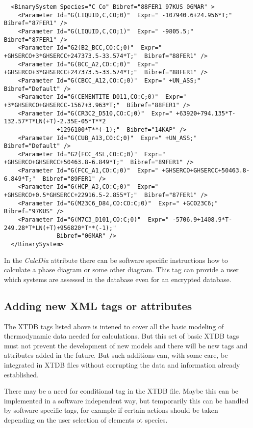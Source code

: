 \documentclass{article}
\begin{document}
{\begin{verbatim}
  <BinarySystem Species="C Co" Bibref="88FER1 97KUS 06MAR" >
    <Parameter Id="G(LIQUID,C,CO;0)"  Expr=" -107940.6+24.956*T;"  Bibref="87FER1" />
    <Parameter Id="G(LIQUID,C,CO;1)"  Expr=" -9805.5;"  Bibref="87FER1" />
    <Parameter Id="G2(B2_BCC,CO:C;0)"  Expr=" +GHSERCO+3*GHSERCC+247373.5-33.574*T;"  Bibref="88FER1" />
    <Parameter Id="G(BCC_A2,CO:C;0)"  Expr=" +GHSERCO+3*GHSERCC+247373.5-33.574*T;"  Bibref="88FER1" />
    <Parameter Id="G(CBCC_A12,CO:C;0)"  Expr=" +UN_ASS;"  Bibref="Default" />
    <Parameter Id="G(CEMENTITE_D011,CO:C;0)"  Expr=" +3*GHSERCO+GHSERCC-1567+3.963*T;"  Bibref="88FER1" />
    <Parameter Id="G(CR3C2_D510,CO:C;0)"  Expr=" +63920+794.135*T-132.57*T*LN(+T)-2.35E-05*T**2
               +1296100*T**(-1);"  Bibref="14KAP" />
    <Parameter Id="G(CUB_A13,CO:C;0)"  Expr=" +UN_ASS;"  Bibref="Default" />
    <Parameter Id="G2(FCC_4SL,CO:C;0)"  Expr=" +GHSERCO+GHSERCC+50463.8-6.849*T;"  Bibref="89FER1" />
    <Parameter Id="G(FCC_A1,CO:C;0)"  Expr=" +GHSERCO+GHSERCC+50463.8-6.849*T;"  Bibref="89FER1" />
    <Parameter Id="G(HCP_A3,CO:C;0)"  Expr=" +GHSERCO+0.5*GHSERCC+22916.5-2.855*T;"  Bibref="87FER1" />
    <Parameter Id="G(M23C6_D84,CO:CO:C;0)"  Expr=" +GCO23C6;"  Bibref="97KUS" />
    <Parameter Id="G(M7C3_D101,CO:C;0)"  Expr=" -5706.9+1408.9*T-249.28*T*LN(+T)+956820*T**(-1);"
               Bibref="06MAR" />
  </BinarySystem>
\end{verbatim}
}

In the {\em CalcDia} attribute there can be  software specific
instructions how to calculate a phase diagram or some other diagram.
This tag can provide a user which systems are assessed in the database
even for an encrypted database.

\subsection{Adding new XML tags or attributes}

The XTDB tags listed above is intened to cover all the basic modeling
of thermodynamic data needed for calculations.  But this set of basic
XTDB tags must not prevent the development of new models and there
will be new tags and attributes added in the future.  But such
additions can, with some care, be integrated in XTDB files without
corrupting the data and information already established.

There may be a need for conditional tag in the XTDB file.  Maybe this
can be implemented in a software independent way, but temporarily this
can be handled by software specific tags, for example if certain
actions should be taken depending on the user selection of elements ot
species.
\end{document}
